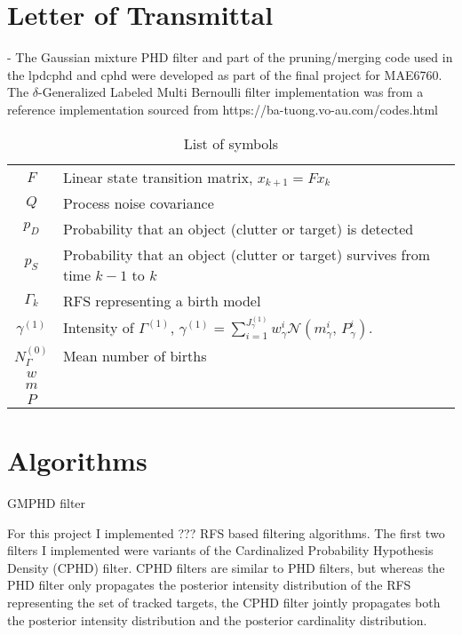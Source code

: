 \documentclass{article}
\begin{document}
\section*{Letter of Transmittal}
- The Gaussian mixture PHD filter and part of the pruning/merging code used in the lpdcphd and cphd were developed as part of the final project for MAE6760. The $\delta$-Generalized Labeled Multi Bernoulli filter implementation was from a reference implementation sourced from https://ba-tuong.vo-au.com/codes.html


\begin{table}[h]
  \begin{center}
    \begin{tabular}{ c l } 
      $F$ & Linear state transition matrix, $x_{k+1} = Fx_k$ \\
      $Q$ & Process noise covariance \\
      $p_{D}$ & Probability that an object (clutter or target) is detected\\
      $p_{S}$ & Probability that an object (clutter or target) survives from time $k-1$ to $k$\\
      $\Gamma_k$ & RFS representing a birth model\\
      $\gamma^{(1)}$ & Intensity of $\Gamma^{(1)}$, $\gamma^{(1)} = \sum_{i=1}^{J_{\gamma}^{(1)}}w_{\gamma}^i \mathcal{N}(m_{\gamma}^i,\,P_{\gamma}^i)$.\\
      $N_{\Gamma}^{(0)}$ & Mean number of births \\
      $w$ & \\
      $m$ & \\
      $P$ & \\
    \end{tabular}
  \end{center}
  \caption{\label{tab:variables}List of symbols}
\end{table}


\section*{Algorithms}
GMPHD filter\cite{gmphd}

For this project I implemented ??? RFS based filtering algorithms. The first two filters I implemented were variants of the Cardinalized Probability Hypothesis Density (CPHD) filter. CPHD filters are similar to PHD filters, but whereas the PHD filter only propagates the posterior intensity distribution of the RFS representing the set of tracked targets, the CPHD filter jointly propagates both the posterior intensity distribution and the posterior cardinality distribution.
\end{document}
